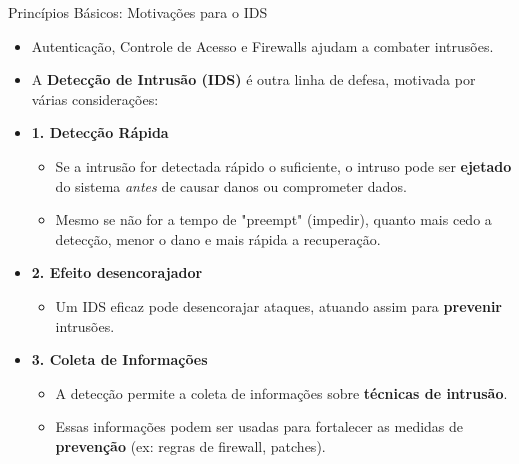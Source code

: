 \begin{frame}{Princípios Básicos: Motivações para o IDS}
    \begin{itemize}
        \item Autenticação, Controle de Acesso e Firewalls ajudam a combater intrusões.
        \item A \textbf{Detecção de Intrusão (IDS)} é outra linha de defesa, motivada por várias considerações:

        \item \textbf{1. Detecção Rápida }
              \begin{itemize}
                  \item Se a intrusão for detectada rápido o suficiente, o intruso pode ser \textbf{ejetado} do sistema \textit{antes} de causar danos ou comprometer dados.
                  \item Mesmo se não for a tempo de "preempt" (impedir), quanto mais cedo a detecção, menor o dano e mais rápida a recuperação.
              \end{itemize}

        \item \textbf{2. Efeito desencorajador}
              \begin{itemize}
                  \item Um IDS eficaz pode desencorajar ataques, atuando assim para \textbf{prevenir} intrusões.
              \end{itemize}

        \item \textbf{3. Coleta de Informações}
              \begin{itemize}
                  \item A detecção permite a coleta de informações sobre \textbf{técnicas de intrusão}.
                  \item Essas informações podem ser usadas para fortalecer as medidas de \textbf{prevenção} (ex: regras de firewall, patches).
              \end{itemize}
    \end{itemize}
\end{frame}

